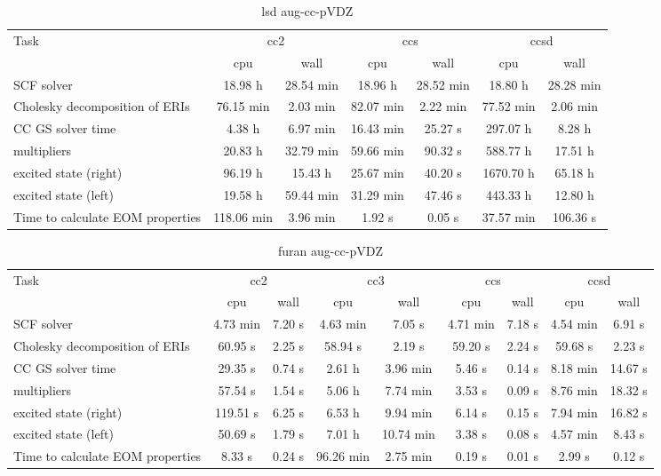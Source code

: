 \documentclass{article}
\begin{document}
\begin{table}
\caption{lsd aug-cc-pVDZ}
\begin{tabular}{lcccccc}
\toprule
Task & \multicolumn{2}{c}{cc2} & \multicolumn{2}{c}{ccs} & \multicolumn{2}{c}{ccsd}\\
\cmidrule(lr){2-3}\cmidrule(lr){4-5}\cmidrule(lr){6-7}
 & cpu & wall & cpu & wall & cpu & wall\\
\midrule
SCF solver & 18.98 h & 28.54 min & 18.96 h & 28.52 min & 18.80 h & 28.28 min\\
Cholesky decomposition of ERIs & 76.15 min & 2.03 min & 82.07 min & 2.22 min & 77.52 min & 2.06 min\\
CC GS solver time & 4.38 h & 6.97 min & 16.43 min & 25.27 s & 297.07 h & 8.28 h\\
multipliers & 20.83 h & 32.79 min & 59.66 min & 90.32 s & 588.77 h & 17.51 h\\
excited state (right) & 96.19 h & 15.43 h & 25.67 min & 40.20 s & 1670.70 h & 65.18 h\\
excited state (left) & 19.58 h & 59.44 min & 31.29 min & 47.46 s & 443.33 h & 12.80 h\\
Time to calculate EOM properties & 118.06 min & 3.96 min & 1.92 s & 0.05 s & 37.57 min & 106.36 s\\
\bottomrule
\end{tabular}
\end{table}
\begin{table}
\caption{furan aug-cc-pVDZ}
\begin{tabular}{lcccccccc}
\toprule
Task & \multicolumn{2}{c}{cc2} & \multicolumn{2}{c}{cc3} & \multicolumn{2}{c}{ccs} & \multicolumn{2}{c}{ccsd}\\
\cmidrule(lr){2-3}\cmidrule(lr){4-5}\cmidrule(lr){6-7}\cmidrule(lr){8-9}
 & cpu & wall & cpu & wall & cpu & wall & cpu & wall\\
\midrule
SCF solver & 4.73 min & 7.20 s & 4.63 min & 7.05 s & 4.71 min & 7.18 s & 4.54 min & 6.91 s\\
Cholesky decomposition of ERIs & 60.95 s & 2.25 s & 58.94 s & 2.19 s & 59.20 s & 2.24 s & 59.68 s & 2.23 s\\
CC GS solver time & 29.35 s & 0.74 s & 2.61 h & 3.96 min & 5.46 s & 0.14 s & 8.18 min & 14.67 s\\
multipliers & 57.54 s & 1.54 s & 5.06 h & 7.74 min & 3.53 s & 0.09 s & 8.76 min & 18.32 s\\
excited state (right) & 119.51 s & 6.25 s & 6.53 h & 9.94 min & 6.14 s & 0.15 s & 7.94 min & 16.82 s\\
excited state (left) & 50.69 s & 1.79 s & 7.01 h & 10.74 min & 3.38 s & 0.08 s & 4.57 min & 8.43 s\\
Time to calculate EOM properties & 8.33 s & 0.24 s & 96.26 min & 2.75 min & 0.19 s & 0.01 s & 2.99 s & 0.12 s\\
\bottomrule
\end{tabular}
\end{table}
\end{document}
